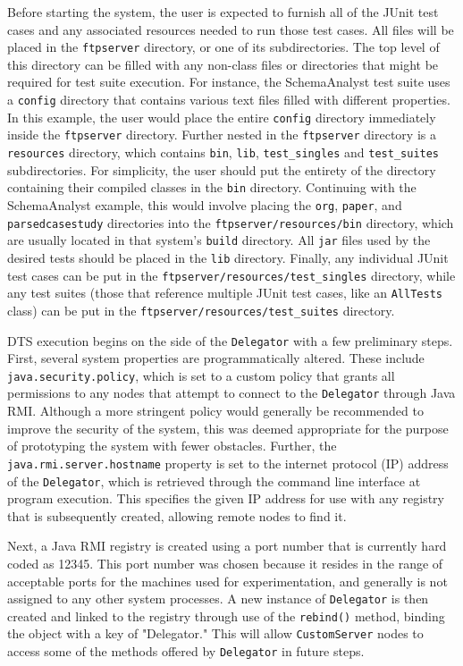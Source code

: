 \documentclass{article}
\begin{document}
{Before starting the system, the user is expected to furnish all of the JUnit test cases and any associated resources needed to run those test cases.  All files will be placed in the \texttt{ftpserver} directory, or one of its subdirectories.  The top level of this directory can be filled with any non-class files or directories that might be required for test suite execution.  For instance, the SchemaAnalyst test suite uses a \texttt{config} directory that contains various text files filled with different properties.  In this example, the user would place the entire \texttt{config} directory immediately inside the \texttt{ftpserver} directory.  Further nested in the \texttt{ftpserver} directory is a \texttt{resources} directory, which contains  \texttt{bin}, \texttt{lib}, \texttt{test\_singles} and \texttt{test\_suites} subdirectories.  For simplicity, the user should put the entirety of the directory containing their compiled classes in the \texttt{bin} directory.  Continuing with the SchemaAnalyst example, this would involve placing the \texttt{org}, \texttt{paper}, and \texttt{parsedcasestudy} directories into the \texttt{ftpserver/resources/bin} directory, which are usually located in that system's \texttt{build} directory.  All \texttt{jar} files used by the desired tests should be placed in the \texttt{lib} directory.  Finally, any individual JUnit test cases can be put in the \texttt{ftpserver/resources/test\_singles} directory, while any test suites (those that reference multiple JUnit test cases, like an \texttt{AllTests} class) can be put in the \texttt{ftpserver/resources/test\_suites} directory.


DTS execution begins on the side of the \texttt{Delegator} with a few preliminary steps.  First, several system properties are programmatically altered. These include \texttt{java.security.policy}, which is set to a custom policy that grants all permissions to any nodes that attempt to connect to the \texttt{Delegator} through Java RMI.  Although a more stringent policy would generally be recommended to improve the security of the system, this was deemed appropriate for the purpose of prototyping the system with fewer obstacles.  Further, the \texttt{java.rmi.server.hostname} property is set to the internet protocol (IP) address of the \texttt{Delegator}, which is retrieved through the command line interface at program execution.  This specifies the given IP address for use with any registry that is subsequently created, allowing remote nodes to find it.

Next, a Java RMI registry is created using a port number that is currently hard coded as 12345.  This port number was chosen because it resides in the range of acceptable ports for the machines used for experimentation, and generally is not assigned to any other system processes.  A new instance of \texttt{Delegator} is then created and linked to the registry through use of the \texttt{rebind()} method, binding the object with a key of "Delegator."  This will allow \texttt{CustomServer} nodes to access some of the methods offered by \texttt{Delegator} in future steps.

}
\end{document}
